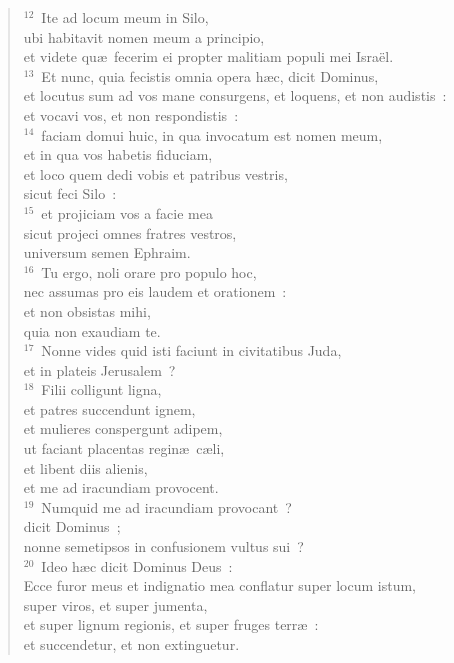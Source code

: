 \begin{flushleft}
\begin{verse}
${}^{12}$~Ite ad locum meum in Silo,\\ ubi habitavit nomen meum a principio,\\ et videte qu\ae\ fecerim ei propter malitiam populi mei Isra\"el.\\
${}^{13}$~Et nunc, quia fecistis omnia opera h\ae c, dicit Dominus,\\ et locutus sum ad vos mane consurgens, et loquens, et non audistis~:\\ et vocavi vos, et non respondistis~:\\
${}^{14}$~faciam domui huic, in qua invocatum est nomen meum,\\ et in qua vos habetis fiduciam,\\ et loco quem dedi vobis et patribus vestris,\\ sicut feci Silo~:\\
${}^{15}$~et projiciam vos a facie mea\\ sicut projeci omnes fratres vestros,\\ universum semen Ephraim.\\
${}^{16}$~Tu ergo, noli orare pro populo hoc,\\ nec assumas pro eis laudem et orationem~:\\ et non obsistas mihi,\\ quia non exaudiam te.\\
${}^{17}$~Nonne vides quid isti faciunt in civitatibus Juda,\\ et in plateis Jerusalem~?\\
${}^{18}$~Filii colligunt ligna,\\ et patres succendunt ignem,\\ et mulieres conspergunt adipem,\\ ut faciant placentas regin\ae\ c\ae li,\\ et libent diis alienis,\\ et me ad iracundiam provocent.\\
${}^{19}$~Numquid me ad iracundiam provocant~?\\ dicit Dominus~;\\ nonne semetipsos in confusionem vultus sui~?\\
${}^{20}$~Ideo h\ae c dicit Dominus Deus~:\\ Ecce furor meus et indignatio mea conflatur super locum istum,\\ super viros, et super jumenta,\\ et super lignum regionis, et super fruges terr\ae~:\\ et succendetur, et non extinguetur.\\

\end{verse}
\end{flushleft}
